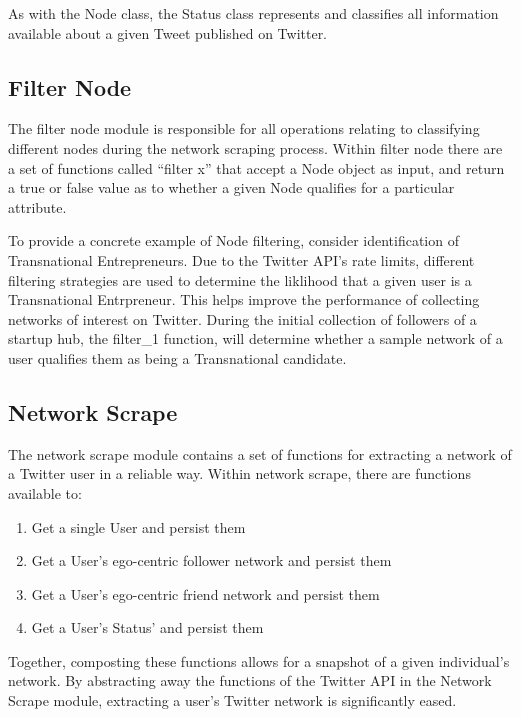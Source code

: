 As with the Node class, the Status class represents and classifies all
information available about a given Tweet published on Twitter.

\subsection{Filter Node}
The filter node module is responsible for all operations relating to
classifying different nodes during the network scraping
process. Within filter node there are a set of functions called
``filter x'' that accept a Node object as input, and return a true or
false value as to whether a given Node qualifies for a particular
attribute.

To provide a concrete example of Node filtering, consider
identification of Transnational Entrepreneurs. Due to the Twitter
API's rate limits, different filtering strategies are used to
determine the liklihood that a given user is a Transnational
Entrpreneur. This helps improve the performance of collecting networks
of interest on Twitter. During the initial collection of followers of
a startup hub, the filter\_1 function, will determine whether a sample
network of a user qualifies them as being a Transnational candidate.

\subsection{Network Scrape}
The network scrape module contains a set of functions for extracting a
network of a Twitter user in a reliable way. Within network scrape,
there are functions available to:

\begin{enumerate}
\item Get a single User and persist them
\item Get a User's ego-centric follower network and persist them
\item Get a User's ego-centric friend network and persist them
\item Get a User's Status' and persist them
\end{enumerate}

Together, composting these functions allows for a snapshot of a given
individual's network. By abstracting away the functions of the Twitter
API in the Network Scrape module, extracting a user's Twitter network
is significantly eased.

